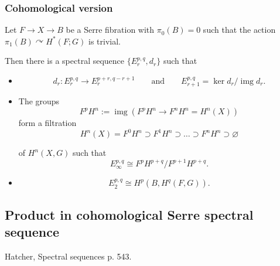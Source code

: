 \subsubsection{Cohomological version}

\begin{thm}
	Let $F\to X\to B$ be a Serre fibration with $\pi_0(B)=0$ such that the action $\pi_1(B)\curvearrowright H^*(F;G)$ is trivial.

	Then there is a spectral sequence $\{E_r^{p,q},d_r\}$ such that
\begin{itemize}
	\item \[d_r:E_r^{p,q}\to E_r^{p+r,q-r+1}\qquad\text{and} \qquad  E_{r+1}^{p,q}=\operatorname{ker} d_r/\operatorname{img} d_r.\]
	\item The groups
		\[F^pH^n:=\operatorname{img} (F^pH^n\to F^nH^n=H^n(X))\]
	form a filtration
	\[H^{n}(X)=F^0H^n\supset F^1H^n\supset \ldots\supset F^nH^n\supset \varnothing \]

	of $H^{n}(X,G)$ such that
	\[E_{\infty}^{p,q}\cong F^pH^{p+q}/F^{p+1}H^{p+q}.\]
\item \[E^{p,q}_2\cong H^p(B,H^{q}(F,G)).\]
\end{itemize}
\end{thm}

\subsection{Product in cohomological Serre spectral sequence}
Hatcher, Spectral sequences p. 543.

